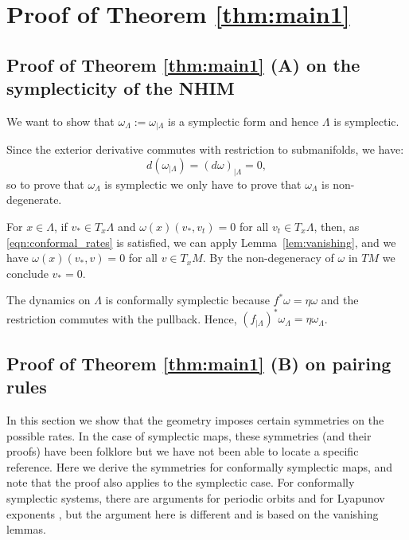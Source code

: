 \documentclass[11pt]{amsart}
\theoremstyle{definition}
\theoremstyle{remark}
\numberwithin{equation}{section}
\begin{document}
\section{Proof  of Theorem \ref{thm:main1}}\label{sec:proofAmain1total}


\subsection{Proof of Theorem \ref{thm:main1}  (A) on the symplecticity of the NHIM}\label{sec:proofAmain1}
We want to show that
$\omega_\Lambda:=\omega_{\mid\Lambda}$
is a symplectic form and hence $\Lambda$ is symplectic.

Since the exterior derivative commutes with restriction to submanifolds,
we have:
\[
d(\omega_{\mid \Lambda})=(d\omega)_{\mid\Lambda}=0,
\]
so to prove that $\omega_\Lambda$ is symplectic we only have to prove that $\omega_\Lambda$ is non-degenerate.

For $x\in\Lambda$, if $v_*\in T_x\Lambda$ and $\omega(x)(v_*,v_t)=0$ for all $v_t\in T_x\Lambda$, then,
as \eqref{eqn:conformal_rates} is satisfied, we can apply Lemma~\ref{lem:vanishing}, and  we have
$\omega(x)(v_*,v)=0$ for all $v\in T_xM$. By the non-degeneracy of $\omega$ in $TM$  we conclude $v_*=0$.


The dynamics on $\Lambda$ is conformally symplectic because
 $f^*\omega=\eta\omega$ and the restriction commutes with the pullback. Hence,
$(f_{\mid\Lambda})^*\omega_\Lambda=\eta\omega_\Lambda$.



\subsection{Proof of  Theorem \ref{thm:main1} (B) on pairing rules}
\label{sec:pairing_rules}


In this section we show  that the geometry imposes certain symmetries on the possible rates.
In the case of symplectic maps, these symmetries (and their proofs) have been folklore
 but we have not been able to locate a specific reference.
Here we derive the symmetries for conformally symplectic maps, and note that the proof also
applies to the symplectic case.
For conformally symplectic systems, there are arguments for periodic orbits and for
Lyapunov exponents \cite{dettmann1996proof,wojtkowski1998conformally}, but the argument here is different and is based on the vanishing lemmas.
\end{document}
